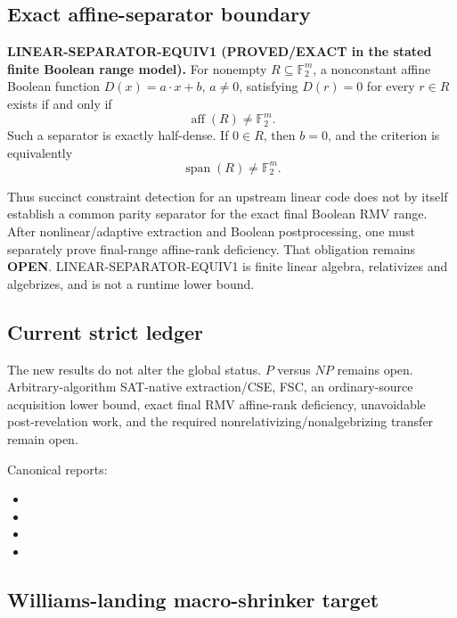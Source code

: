 \documentclass[11pt]{article}
\theoremstyle{plain}
\theoremstyle{definition}
\theoremstyle{remark}
\begin{document}
\subsection{Exact affine-separator boundary}

\textbf{LINEAR-SEPARATOR-EQUIV1 (PROVED/EXACT in the stated finite Boolean
range model).}
For nonempty \(R\subseteq\mathbb F_2^m\), a nonconstant affine Boolean
function \(D(x)=a\cdot x+b\), \(a\ne0\), satisfying \(D(r)=0\) for every
\(r\in R\) exists if and only if
\[
\operatorname{aff}(R)\ne\mathbb F_2^m.
\]
Such a separator is exactly half-dense.  If \(0\in R\), then \(b=0\), and the
criterion is equivalently
\[
\operatorname{span}(R)\ne\mathbb F_2^m.
\]

Thus succinct constraint detection for an upstream linear code does not by
itself establish a common parity separator for the exact final Boolean RMV
range.  After nonlinear/adaptive extraction and Boolean postprocessing, one
must separately prove final-range affine-rank deficiency.  That obligation
remains \textbf{OPEN}.  LINEAR-SEPARATOR-EQUIV1 is finite linear algebra,
relativizes and algebrizes, and is not a runtime lower bound.

\subsection{Current strict ledger}

The new results do not alter the global status.  \(P\) versus \(NP\) remains
open.  Arbitrary-algorithm SAT-native extraction/CSE, FSC, an
ordinary-source acquisition lower bound, exact final RMV affine-rank
deficiency, unavoidable post-revelation work, and the required
nonrelativizing/nonalgebrizing transfer remain open.

Canonical reports:
\begin{itemize}[leftmargin=1.4em]
\item {}
\item {}
\item {}
\item {}
\end{itemize}


\subsection{Williams-landing macro-shrinker target}
\end{document}
